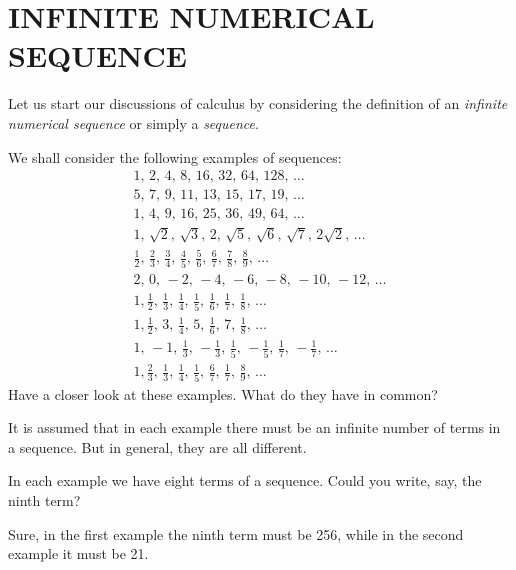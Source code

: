 \chapter{INFINITE NUMERICAL SEQUENCE}
\label{infinite-seq}
{\parindent=0pt
\athr Let us start our discussions of calculus by considering the definition of an \emph{infinite numerical sequence} or simply a \emph{sequence}.

We shall consider the following examples of sequences:
\begin{align}%
 1, \, 2, \, 4, \, 8, \, 16, \, 32, \, 64, \, 128, \, \ldots \label{series-01}\\
 5, \, 7, \, 9, \, 11, \, 13, \, 15, \, 17, \, 19, \, \ldots \label{series-02}\\
1, \, 4, \, 9, \, 16, \, 25, \, 36, \, 49, \, 64, \, \ldots \label{series-03}\\
1,\, \sqrt{2}, \, \sqrt{3}, \, 2, \, \sqrt{5}, \, \sqrt{6}, \, \sqrt{7}, \, 2 \sqrt{2}, \, \ldots \label{series-04}\\
\frac{1}{2}, \,\frac{2}{3}, \,\frac{3}{4}, \,\frac{4}{5}, \,\frac{5}{6}, \,\frac{6}{7}, \,\frac{7}{8}, \,\frac{8}{9}, \, \ldots \label{series-05}\\
2, \, 0, \, - 2, \, - 4, \, - 6, \, - 8, \, - 10, \, - 12, \, \ldots \label{series-06}\\
1, \frac{1}{2}, \,\frac{1}{3}, \,\frac{1}{4}, \,\frac{1}{5}, \,\frac{1}{6}, \,\frac{1}{7}, \,\frac{1}{8}, \, \ldots \label{series-07}\\
1, \frac{1}{2}, \, 3, \, \frac{1}{4}, \, 5, \,\frac{1}{6}, \, 7, \,\frac{1}{8}, \, \ldots \label{series-08}\\
1, \, -1, \, \frac{1}{3}, \, -\frac{1}{3}, \, \frac{1}{5}, \, -\frac{1}{5}, \, \frac{1}{7}, \, -\frac{1}{7}, \, \ldots \label{series-09}\\
1, \frac{2}{3}, \,\frac{1}{3}, \,\frac{1}{4}, \,\frac{1}{5}, \,\frac{6}{7}, \,\frac{1}{7}, \,\frac{8}{9}, \, \ldots \label{series-10}
\end{align}
Have a closer look at these examples. What do they have in common?

\rdr It is assumed that in each example there must be an infinite number of terms in a sequence. But in general, they are all different.

\athr In each example we have eight terms of a sequence. Could you write, say, the ninth term?

\rdr Sure, in the first example the ninth term must be 256, while in the second example it must be 21.

}
